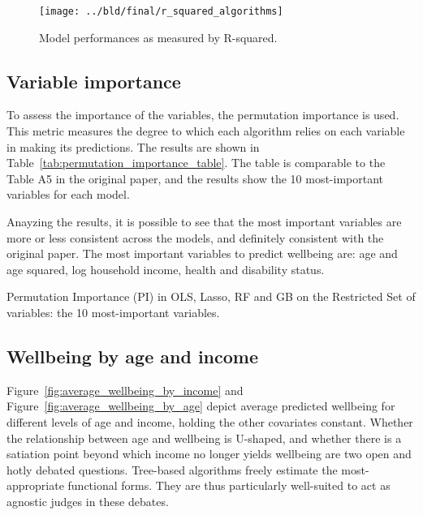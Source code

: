\documentclass[11pt, a4paper, leqno]{article}
\begin{document}
\begin{figure}[htbp]
    \centering
    \texttt{[image: ../bld/final/r\_squared\_algorithms]}
    \caption{Model performances as measured by R-squared.}
    \label{fig:r_squared_algorithms}
\end{figure}


\subsection{Variable importance}

To assess the importance of the variables, the permutation importance is used. This metric
measures the degree to which each algorithm relies on each variable in making its predictions.
The results are shown in Table~\ref{tab:permutation_importance_table}. The table is comparable
to the Table A5 in the original paper, and the results show the 10 most-important variables
for each model.

Anayzing the results, it is possible to see that the most important variables are more or less
consistent across the models, and definitely consistent with the original paper. The most
important variables to predict wellbeing are: age and age squared, log household income,
health and disability status.



\begin{table}[htbp]
    \centering
    
    \caption{Permutation Importance (PI) in OLS, Lasso, RF and GB on the Restricted Set of variables: the 10 most-important variables.}
    \label{tab:permutation_importance_table}
\end{table}


\subsection{Wellbeing by age and income}

Figure~\ref{fig:average_wellbeing_by_income} and Figure~\ref{fig:average_wellbeing_by_age} depict
average predicted wellbeing for different levels of age and income, holding the other covariates
constant. Whether the relationship between age and wellbeing is U-shaped, and whether there is a
satiation point beyond which income no longer yields wellbeing are two open and hotly debated questions.
Tree-based algorithms freely estimate the most-appropriate functional forms. They are thus
particularly well-suited to act as agnostic judges in these debates.
\end{document}
